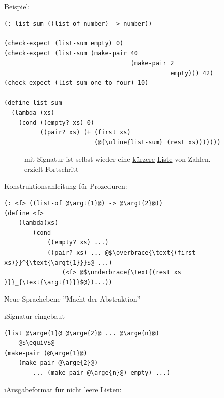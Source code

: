Beispiel:\\
\begin{lstlisting}
(: list-sum ((list-of number) -> number))

(check-expect (list-sum empty) 0)
(check-expect (list-sum (make-pair 40
                                   (make-pair 2
                                              empty))) 42)  
(check-expect (list-sum one-to-four) 10)

(define list-sum
  (lambda (xs)
    (cond ((empty? xs) 0)
          ((pair? xs) (+ (first xs)
                         (@{\uline{list-sum} (rest xs)))))))
\end{lstlisting}
\begin{figure}[htbp]
\begin{minipage}[b]{\textwidth}
\hspace*{2cm}
\begin{minipage}[b]{0.3\textwidth}
 mit Signatur  ist selbst wieder eine \uline{kürzere} \uline{Liste} von Zahlen.\\
 erzielt Fortschritt
\end{minipage}
\end{minipage}
\end{figure}
Konstruktionsanleitung für Prozeduren:
\begin{lstlisting}
(: <f> ((list-of @\argt{1}@) -> @\argt{2}@))
(define <f>
	(lambda(xs)
		(cond 
			((empty? xs) ...)
			((pair? xs) ... @$\overbrace{\text{(first xs)}}^{\text{\argt{1}}}$@ ...)
				(<f> @$\underbrace{\text{(rest xs )}}_{\text{\argt{1}}}$@))...))
\end{lstlisting}
Neue Sprachebene ''Macht der Abstraktion''
\begin{enumerate}[-]
\i Signatur  eingebaut
\begin{lstlisting}
(list @\arge{1}@ @\arge{2}@ ... @\arge{n}@)
	@$\equiv$@
(make-pair (@\arge{1}@)
	(make-pair @\arge{2}@)
		... (make-pair @\arge{n}@) empty) ...)
\end{lstlisting}
\i Ausgabeformat für nicht leere Listen:\\
\end{enumerate}
